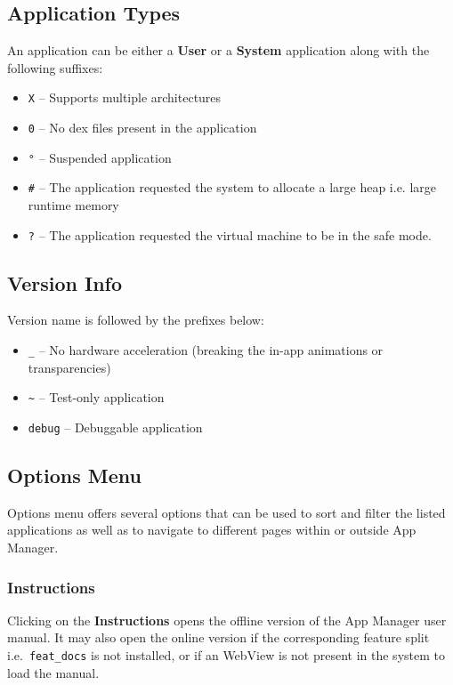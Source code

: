 \subsection{Application Types}\label{subsec:main-page-application-types} %
An application can be either a \textbf{User} or a \textbf{System} application along with the following suffixes:
\begin{itemize}
    \item \texttt{X} -- Supports multiple architectures
    \item \texttt{0} -- No dex files present in the application
    \item \texttt{\textdegree°} -- Suspended application
    \item \texttt{\#} -- The application requested the system to allocate a large heap i.e. large runtime memory
    \item \texttt{?} -- The application requested the virtual machine to be in the safe mode.
\end{itemize}

\subsection{Version Info}\label{subsec:main-page-version-info} %
Version name is followed by the prefixes below:
\begin{itemize}
    \item \texttt{\_} -- No hardware acceleration (breaking the in-app animations or transparencies)
    \item \texttt{\textasciitilde} -- Test-only application
    \item \texttt{debug} -- Debuggable application
\end{itemize}

\subsection{Options Menu}\label{subsec:main-page-options-menu} %
Options menu offers several options that can be used to sort and filter the listed applications as well as to navigate
to different pages within or outside App Manager.

\subsubsection{Instructions} %
Clicking on the \textbf{Instructions} opens the offline version of the App Manager user manual. It may also open the
online version if the corresponding feature split i.e.\ \texttt{feat\_docs} is not installed, or if an WebView is not
present in the system to load the manual.

